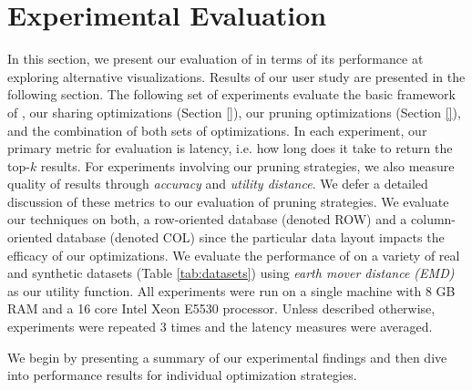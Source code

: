 
\section{Experimental Evaluation}
\label{sec:experiments}
 
In this section, we present our evaluation of \SeeDB in terms of its performance 
at exploring alternative visualizations. 
Results of our user study are presented in the following section.
The following set of experiments evaluate the basic framework of \SeeDB, our sharing optimizations 
(Section \ref{}), our pruning optimizations (Section \ref{}), and the combination of both sets of optimizations.
In each experiment, our primary metric for evaluation is latency, i.e. how long does it take \SeeDB to return the top-$k$ results. 
For experiments involving our pruning strategies, we also measure quality of results through {\it accuracy} and {\it utility distance}. 
We defer a detailed discussion of these metrics to our evaluation of pruning strategies.
We evaluate our techniques on both, a row-oriented database (denoted ROW) and a
column-oriented database (denoted COL) since the particular data layout impacts the efficacy of our optimizations.
We evaluate the performance of \SeeDB on a variety of real and synthetic datasets (Table 
\ref{tab:datasets}) using {\it earth mover distance (EMD)} as our utility function.
All experiments were run on a single machine with 8 GB RAM and a 16 core Intel 
Xeon E5530 processor. 
Unless described otherwise, experiments were repeated 3 times and the latency measures 
were averaged.

We begin by presenting a summary of our experimental findings and then dive into performance results for individual optimization strategies.



